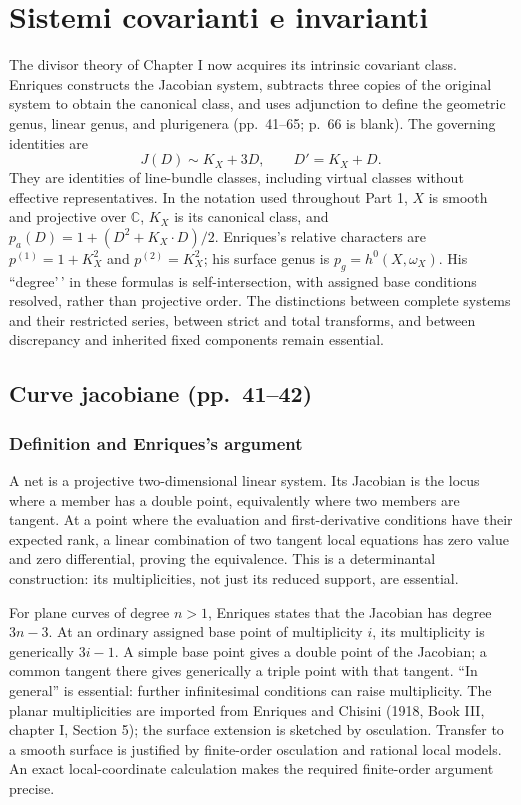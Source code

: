 \chapter{Sistemi covarianti e invarianti}

The divisor theory of Chapter I now acquires its intrinsic covariant class. Enriques constructs the Jacobian system, subtracts three copies of the original system to obtain the canonical class, and uses adjunction to define the geometric genus, linear genus, and plurigenera (pp.~41--65; p.~66 is blank). The governing identities are \[
J(D)\sim K_X+3D,\qquad D'=K_X+D.
\] They are identities of line-bundle classes, including virtual classes without effective representatives. In the notation used throughout Part 1, \(X\) is smooth and projective over \(\mathbb C\), \(K_X\) is its canonical class, and \(p_a(D)=1+(D^2+K_X\cdot D)/2\). Enriques's relative characters are \(p^{(1)}=1+K_X^2\) and \(p^{(2)}=K_X^2\); his surface genus is \(p_g=h^0(X,\omega_X)\). His ``degree'\,' in these formulas is self-intersection, with assigned base conditions resolved, rather than projective order. The distinctions between complete systems and their restricted series, between strict and total transforms, and between discrepancy and inherited fixed components remain essential.

\section[Curve jacobiane]{Curve jacobiane (pp.~41--42)}\label{commentary-II-1}

\subsection{Definition and Enriques's argument}

A net is a projective two-dimensional linear system. Its Jacobian is the locus where a member has a double point, equivalently where two members are tangent. At a point where the evaluation and first-derivative conditions have their expected rank, a linear combination of two tangent local equations has zero value and zero differential, proving the equivalence. This is a determinantal construction: its multiplicities, not just its reduced support, are essential.

For plane curves of degree \(n>1\), Enriques states that the Jacobian has degree \(3n-3\). At an ordinary assigned base point of multiplicity \(i\), its multiplicity is generically \(3i-1\). A simple base point gives a double point of the Jacobian; a common tangent there gives generically a triple point with that tangent. ``In general'' is essential: further infinitesimal conditions can raise multiplicity. The planar multiplicities are imported from Enriques and Chisini (1918, Book III, chapter I, Section 5); the surface extension is sketched by osculation. Transfer to a smooth surface is justified by finite-order osculation and rational local models. An exact local-coordinate calculation makes the required finite-order argument precise.

